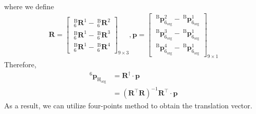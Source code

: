 where we define
\begin{equation*}
\begin{split}
\mathbf{R} =  
\begin{bmatrix}
\  _{\mathrm{6}}^{\mathrm{B}}\mathbf{R}^{1} - \  _{\mathrm{6}}^{\mathrm{B}}\mathbf{R}^{2}\\ 
\  _{\mathrm{6}}^{\mathrm{B}}\mathbf{R}^{1} - \  _{\mathrm{6}}^{\mathrm{B}}\mathbf{R}^{3}\\ 
\  _{\mathrm{6}}^{\mathrm{B}}\mathbf{R}^{1} - \  _{\mathrm{6}}^{\mathrm{B}}\mathbf{R}^{4}
\end{bmatrix}_{9 \times 3}, 
\boldsymbol{p} = 
\begin{bmatrix}
\ ^\mathrm{B}\!\boldsymbol{p}_\mathrm{6_{org}}^{2} -\ ^\mathrm{B}\!\boldsymbol{p}_\mathrm{6_{org}}^{1} \\ 
\ ^\mathrm{B}\!\boldsymbol{p}_\mathrm{6_{org}}^{3} -\ ^\mathrm{B}\!\boldsymbol{p}_\mathrm{6_{org}}^{1} \\ 
\ ^\mathrm{B}\!\boldsymbol{p}_\mathrm{6_{org}}^{4} -\ ^\mathrm{B}\!\boldsymbol{p}_\mathrm{6_{org}}^{1} 
\end{bmatrix}_{9 \times 1}
\end{split}
\end{equation*}
Therefore,
\begin{equation*}
\begin{split}
^\mathrm{6}\!\boldsymbol{p}_\mathrm{H_{org}} 	&= \mathbf{R}^{\dagger} \cdot \boldsymbol{p}\\
					  							&= \left( \mathbf{R}^\top\mathbf{R}\right) ^{-1}\mathbf{R}^\top \cdot \boldsymbol{p}
\end{split}
\end{equation*}
As a result, we can utilize four-points method to obtain the translation vector.
